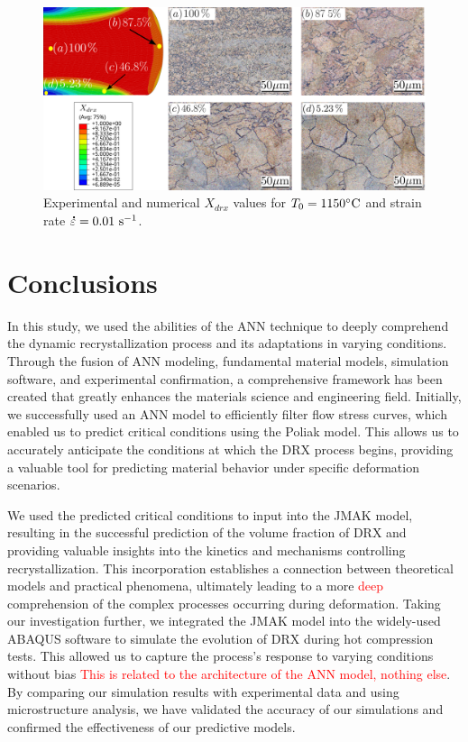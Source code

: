 \documentclass[metals,article,submit,pdftex,moreauthors]{Definitions/mdpi}
\DeclareRobustCommand{\mdot}[1]{\accentset{\mbox{\bfseries .}}{#1}}
\DeclareRobustCommand{\ps}{\text{s}^{-1}}
\begin{document}
\begin{figure}[H]
\centering
\includegraphics[width=0.98\columnwidth]{Figures/drxExpNum}
\caption{Experimental and numerical $X_{drx}$ values for $T_0=1150\celsius$ and strain rate $\mdot{\varepsilon}=0.01~\ps$.}
\label{fig:expNumDRX}
\end{figure}

\section{Conclusions\label{sec:Conclusions}}

In this study, we used the abilities of the ANN technique to deeply comprehend the dynamic recrystallization process and its adaptations in varying conditions.
Through the fusion of ANN modeling, fundamental material models, simulation software, and experimental confirmation, a comprehensive framework has been created that greatly enhances the materials science and engineering field.
Initially, we successfully used an ANN model to efficiently filter flow stress curves, which enabled us to predict critical conditions using the Poliak model.
This allows us to accurately anticipate the conditions at which the DRX process begins, providing a valuable tool for predicting material behavior under specific deformation scenarios.

We used the predicted critical conditions to input into the JMAK model, resulting in the successful prediction of the volume fraction of DRX and providing valuable insights into the kinetics and mechanisms controlling recrystallization.
This incorporation establishes a connection between theoretical models and practical phenomena, ultimately leading to a more \textcolor{red}{deep} comprehension of the complex processes occurring during deformation.
Taking our investigation further, we integrated the JMAK model into the widely-used ABAQUS software to simulate the evolution of DRX during hot compression tests.
This allowed us to capture the process's response to varying conditions without bias \textcolor{red}{This is related to the architecture of the ANN model, nothing else}.
By comparing our simulation results with experimental data and using microstructure analysis, we have validated the accuracy of our simulations and confirmed the effectiveness of our predictive models.
\end{document}
